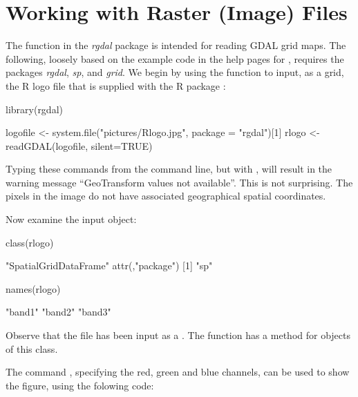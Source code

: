 \section{Working with Raster (Image) Files}
The function  in the {\em rgdal} package is
intended for reading GDAL grid maps.
The following, loosely based on the example code in the help pages for
, requires the packages {\em rgdal}, {\em sp}, and
       {\em grid}.  We begin by using the function 
to input, as a grid, the R logo file that is supplied with the
R package :
\begin{Schunk}
\begin{Sinput}
library(rgdal)
\end{Sinput}
\begin{Sinput}
logofile <- system.file("pictures/Rlogo.jpg",
                        package = "rgdal")[1]
rlogo <- readGDAL(logofile, silent=TRUE)
\end{Sinput}
\end{Schunk}
Typing these commands from the command line, but with
, will result in the warning message ``GeoTransform
values not available''.  This is not surprising.  The pixels in the
image do not have associated geographical spatial coordinates.

Now examine the input object:
\begin{Schunk}
\begin{Sinput}
class(rlogo)
\end{Sinput}
\begin{Soutput}
[1] "SpatialGridDataFrame"
attr(,"package")
[1] "sp"
\end{Soutput}
\begin{Sinput}
names(rlogo)
\end{Sinput}
\begin{Soutput}
[1] "band1" "band2" "band3"
\end{Soutput}
\end{Schunk}
\noindent
Observe that the file has been input as a . The
function  has a method for objects of this class.

The command , specifying the red, green and blue channels,
can be used to show the figure, using the folowing code:

